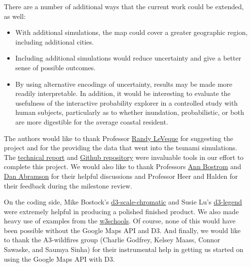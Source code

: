 \documentclass{vgtc}                          %
\begin{document}
There are a number of additional ways that the current work could be extended, as well:
\begin{itemize}
    \item With additional simulations, the map could cover a greater geographic region, including additional cities.
    \item Including additional simulations would reduce uncertainty and give a better sense of possible outcomes.
    \item By using alternative encodings of uncertainty, results may be made more readily interpretable. In addition, it would be interesting to evaluate the usefulness of the interactive probability explorer in a controlled study with human subjects, particularly as to whether inundation, probabilistic, or both are more digestible for the average coastal resident. %
\end{itemize}
\acknowledgments
{
    The authors would like to thank Professor \href{http://faculty.washington.edu/rjl}{Randy LeVeque} for suggesting the project and for the providing the data that went into the tsunami simulations.
	The \href{https://digital.lib.washington.edu/researchworks/handle/1773/25916}{technical report} and \href{https://github.com/rjleveque/ptha_tutorial}{Github repository} were invaluable tools in our effort to complete this project.
	We would also like to thank Professors \href{https://evans.uw.edu/profile/bostrom}{Ann Bostrom} and \href{http://urbdp.be.washington.edu/people/dan-abramson/}{Dan Abramson} for their helpful discussions and Professor Heer and Halden for their feedback during the milestone review.
			
    On the coding side, Mike Bostock's \href{https://github.com/d3/d3-scale-chromatic}{d3-scale-chromatic} \cite{d3-scale-chromatic} 
    and Susie Lu's \href{http://d3-legend.susielu.com/}{d3-legend} \cite{d3-legend} were extremely helpful in producing a polished finished product.
    We also made heavy use of examples from the \href{https://www.w3schools.com/}{w3schools}.
    Of course, none of this would have been possible without the Google Maps API and D3.
    And finally, we would like to thank the A3-wildfires group (Charlie Godfrey, Kelsey Maass, Connor Sawaske, and Saumya Sinha) for their instrumental help in getting us started on using the Google Maps API with D3.
}
%

%
%
%


\end{document}
